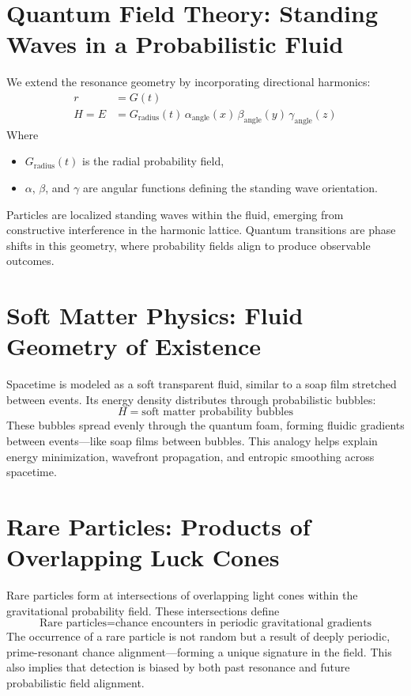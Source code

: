 \documentclass[12pt]{article}
\begin{document}
\section{Quantum Field Theory: Standing Waves in a Probabilistic Fluid}
We extend the resonance geometry by incorporating directional harmonics:
\begin{align}
    r &= G(t) \\
    H = E &= G_{\text{radius}}(t)\, \alpha_{\text{angle}}(x)\, \beta_{\text{angle}}(y)\, \gamma_{\text{angle}}(z)
\end{align}
Where
\begin{itemize}
    \item $G_{\text{radius}}(t)$ is the radial probability field,
    \item $\alpha$, $\beta$, and $\gamma$ are angular functions defining the standing wave orientation.
\end{itemize}
Particles are localized standing waves within the fluid, emerging from constructive interference in the harmonic lattice. Quantum transitions are phase shifts in this geometry, where probability fields align to produce observable outcomes.

\section{Soft Matter Physics: Fluid Geometry of Existence}
Spacetime is modeled as a soft transparent fluid, similar to a soap film stretched between events. Its energy density distributes through probabilistic bubbles:
\begin{equation}
    H = \text{soft matter probability bubbles}
\end{equation}
These bubbles spread evenly through the quantum foam, forming fluidic gradients between events---like soap films between bubbles. This analogy helps explain energy minimization, wavefront propagation, and entropic smoothing across spacetime.

\section{Rare Particles: Products of Overlapping Luck Cones}
Rare particles form at intersections of overlapping light cones within the gravitational probability field. These intersections define
\begin{equation}
    \text{Rare particles} = \text{chance encounters in periodic gravitational gradients}
\end{equation}
The occurrence of a rare particle is not random but a result of deeply periodic, prime-resonant chance alignment---forming a unique signature in the field. This also implies that detection is biased by both past resonance and future probabilistic field alignment.
\end{document}
